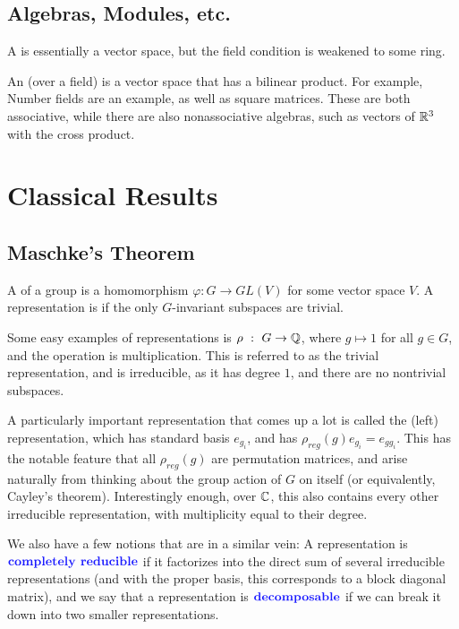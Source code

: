\documentclass{article}
\renewcommand{\phi}{\varphi}
\begin{document}
\subsection{Algebras, Modules, etc.}
A  is essentially a vector space, but the field condition is weakened to some ring.

An  (over a field) is a vector space that has a bilinear product. For example, Number fields are an example, as well as square matrices. These are both associative, while there are also nonassociative algebras, such as vectors of $\mathbb R^3$ with the cross product.

\section{Classical Results}
\subsection{Maschke's Theorem}
\begin{definition}
A  of a group is a homomorphism $\phi : G \to GL(V)$ for some vector space $V$. A representation is  if the only $G$-invariant subspaces are trivial.
\end{definition}

Some easy examples of representations is $\rho \ : \ G \to \mathbb Q$, where $g \mapsto 1$ for all $g \in G$, and the operation is multiplication. This is referred to as the trivial representation, and is irreducible, as it has degree $1$, and there are no nontrivial subspaces.

A particularly important representation that comes up a lot is called the (left)  representation, which has standard basis $e_{g_i}$, and has $\rho_{reg}(g) e_{g_i} = e_{gg_i}$. This has the notable feature that all  $\rho_{reg} (g)$ are permutation matrices, and arise naturally from thinking about the group action of $G$ on itself (or equivalently, Cayley's theorem). Interestingly enough, over $\mathbb C$, this also contains every other irreducible representation, with multiplicity equal to their degree.

We also have a few notions that are in a similar vein: A representation is $\vocab{completely reducible}$ if it factorizes into the direct sum of several irreducible representations (and with the proper basis, this corresponds to a block diagonal matrix), and we say that a representation is $\vocab{decomposable}$ if we can break it down into two smaller representations.
\end{document}
